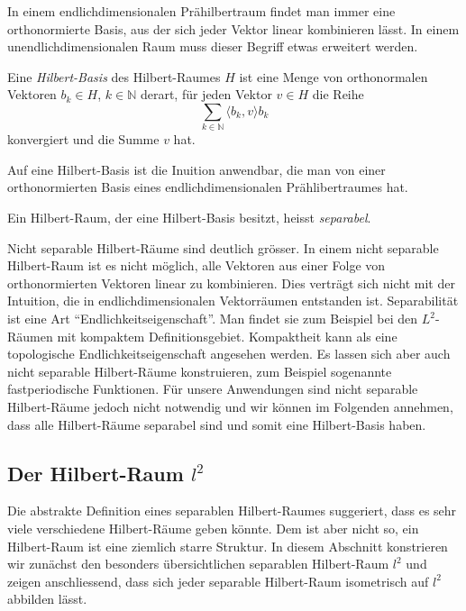 In einem endlichdimensionalen Prähilbertraum findet man immer eine
orthonormierte Basis, aus der sich jeder Vektor linear kombinieren
lässt.
In einem unendlichdimensionalen Raum muss dieser Begriff etwas 
erweitert werden.

\begin{definition}
Eine {\em Hilbert-Basis} des Hilbert-Raumes $H$ ist eine Menge von orthonormalen
%
Vektoren $b_k\in H$, $k\in \mathbb{N}$ derart, für jeden Vektor $v\in H$
die Reihe 
\[
\sum_{k\in\mathbb{N}} \langle b_k,v\rangle b_k
\]
konvergiert und die Summe $v$ hat.
\end{definition}

Auf eine Hilbert-Basis ist die Inuition anwendbar, die man von 
einer orthonormierten Basis eines endlichdimensionalen Prählibertraumes
hat.

\begin{definition}
%
Ein Hilbert-Raum, der eine Hilbert-Basis besitzt, heisst {\em separabel}.
\end{definition}

Nicht separable Hilbert-Räume sind deutlich grösser.
In einem nicht separable Hilbert-Raum ist es nicht möglich, alle Vektoren
aus einer Folge von orthonormierten Vektoren linear zu kombinieren.
Dies verträgt sich nicht mit der Intuition, die in endlichdimensionalen
Vektorräumen entstanden ist.
Separabilität ist eine Art ``Endlichkeitseigenschaft''.
Man findet sie zum Beispiel bei den $L^2$-Räumen mit kompaktem
Definitionsgebiet.
Kompaktheit kann als eine topologische
Endlichkeitseigenschaft angesehen werden.
Es lassen sich aber auch nicht separable Hilbert-Räume konstruieren,
zum Beispiel sogenannte fastperiodische Funktionen.
%
Für unsere Anwendungen sind nicht separable Hilbert-Räume jedoch nicht
notwendig und wir können im Folgenden annehmen, dass alle Hilbert-Räume
separabel sind und somit eine Hilbert-Basis haben.

%
%
\subsection{Der Hilbert-Raum $l^2$}
Die abstrakte Definition eines separablen Hilbert-Raumes suggeriert,
dass es sehr viele verschiedene Hilbert-Räume geben könnte.
Dem ist aber nicht so, ein Hilbert-Raum ist eine ziemlich starre Struktur.
In diesem Abschnitt konstrieren wir zunächst den besonders übersichtlichen
separablen Hilbert-Raum $l^2$ und zeigen anschliessend, dass sich jeder
separable Hilbert-Raum isometrisch auf $l^2$ abbilden lässt.

